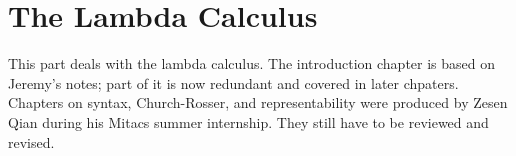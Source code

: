\documentclass[../../include/open-logic-part]{subfiles}
\begin{document}
\part{The Lambda Calculus}

\begin{editorial}
This part deals with the lambda calculus. The introduction chapter is
based on Jeremy's notes; part of it is now redundant and covered in
later chpaters. Chapters on syntax, Church-Rosser, and
representability were produced by Zesen Qian during his Mitacs summer
internship. They still have to be reviewed and revised.
\end{editorial}





\OLEndPartHook
\end{document}
